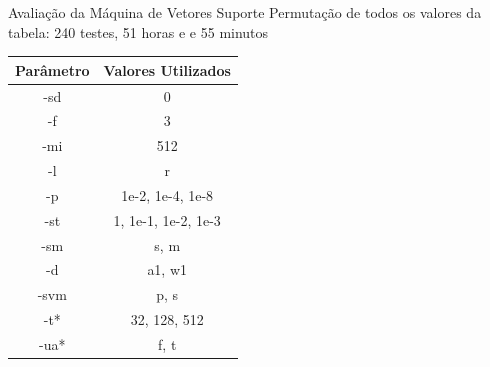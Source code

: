 \documentclass{beamer}
\begin{document}
\begin{frame}{Avaliação da Máquina de Vetores Suporte}
Permutação de todos os valores da tabela: 240 testes, 51 horas e e 55 minutos
\begin{table}
    \centering
    \begin{tabular}{|c|c|} \hline
        Parâmetro & Valores Utilizados \\ \hline
        -sd & 0 \\ \hline
        -f & 3 \\ \hline
        -mi & 512 \\ \hline
        -l & r \\ \hline
        -p & 1e-2, 1e-4, 1e-8 \\ \hline
        -st & 1, 1e-1, 1e-2, 1e-3 \\ \hline
        -sm & s, m \\ \hline
        -d & a1, w1\\ \hline
        -svm & p, s\\ \hline
        -t* & 32, 128, 512\\ \hline
        -ua* & f, t \\ \hline
    \end{tabular}
\end{table}
\end{frame}
\end{document}
